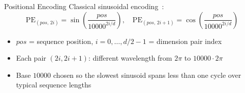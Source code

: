 \begin{frame}{Positional Encoding}
  \vspace{-0.3em}
  Classical sinusoidal encoding~\cite{vaswani2017attention}:
  \[
    \mathrm{PE}_{(pos,\,2i)} = \sin\!\left(\frac{pos}{10000^{2i/d}}\right), \quad
    \mathrm{PE}_{(pos,\,2i+1)} = \cos\!\left(\frac{pos}{10000^{2i/d}}\right)
  \]
  \vspace{-0.8em}
  \begin{itemize}
    \item $pos$ = sequence position, $i = 0, \ldots, d/2{-}1$ = dimension pair index
    \item Each pair $(2i, 2i{+}1)$: different wavelength from $2\pi$ to $10000 \cdot 2\pi$
    \item Base $10000$ chosen so the slowest sinusoid spans less than one cycle over typical sequence lengths
  \end{itemize}
\end{frame}

